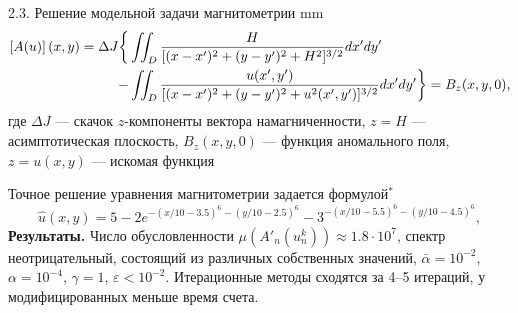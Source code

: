 \documentclass[10pt,pdf, mathserif, hyperref={unicode}]{beamer}
\begin{document}
\begin{frame}{2.3. Решение модельной задачи магнитометрии}
	 mm
	\begin{equation*}\begin{aligned}
	\left[A(u)\right](x,y)=\Delta J  \bigg\{&\iint_{D} \frac{H}{[(x-x')^2+(y-y')^2+H^2]^{3/2}}dx'dy' \notag\\
	- &\iint_{D} \frac{u(x',y')}{[(x-x')^2+(y-y')^2+u^2(x',y')]^{3/2}}dx'dy' \bigg\}= B_z(x,y,0),
	\end{aligned} \end{equation*}
	где $\Delta J$ --- скачок $z$-компоненты вектора намагниченности, $z=H$ --- асимптотическая плоскость, $ B_z(x,y,0)$ --- функция аномального поля, $z=u(x,y)$ --- искомая функция%
	
	\smallskip
	Точное решение уравнения магнитометрии задается формулой$^*$%
	$$\hat{u}(x,y)=5-2e^{-(x/10-3.5)^6-(y/10-2.5)^6}-3^{-(x/10-5.5)^6-(y/10-4.5)^6},$$
	\textbf{\color{blue}Результаты.} Число обусловленности $\mu(A'_n(u_n^k))\approx 1.8\cdot 10^7$, спектр неотрицательный, состоящий из различных собственных значений, $\bar\alpha=10^{-2}$, $\alpha = 10^{-4}$, $\gamma=1$, $\varepsilon < 10^{-2}$. Итерационные методы сходятся за 4--5 итераций, у модифицированных меньше время счета.
\let\thefootnote\relax\let\thefootnote\relax{}
\end{frame}
\end{document}
